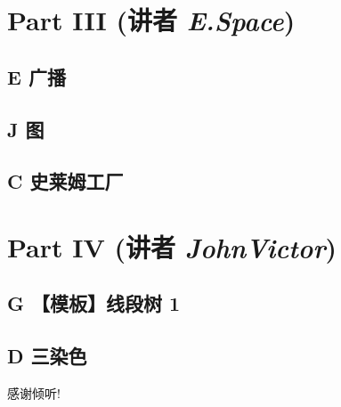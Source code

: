 \documentclass[dvipsnames]{ctexbeamer}
\begin{document}
\section{Part III (讲者 {\itshape E.Space})}

\subsection{E 广播}


\subsection{J 图}


\subsection{C 史莱姆工厂}


\section{Part IV (讲者 {\itshape JohnVictor})}

\subsection{G 【模板】线段树 1}


\subsection{D 三染色}



\begin{frame}{}
    \begin{center}
        \Large 感谢倾听!
    \end{center}
\end{frame}
\end{document}
